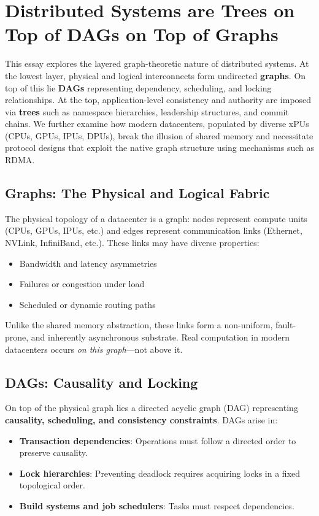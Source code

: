 \documentclass[../../../OAE-SPEC-MAIN.tex]{subfiles}
\begin{document}
\section{Distributed Systems are Trees on Top of DAGs on Top of Graphs}

This essay explores the layered graph-theoretic nature of distributed systems. At the lowest layer, physical and logical interconnects form undirected \textbf{graphs}. On top of this lie \textbf{DAGs} representing dependency, scheduling, and locking relationships. At the top, application-level consistency and authority are imposed via \textbf{trees} such as namespace hierarchies, leadership structures, and commit chains. We further examine how modern datacenters, populated by diverse xPUs (CPUs, GPUs, IPUs, DPUs), break the illusion of shared memory and necessitate protocol designs that exploit the native graph structure using mechanisms such as RDMA.

\subsection{Graphs: The Physical and Logical Fabric}
The physical topology of a datacenter is a graph: nodes represent compute units (CPUs, GPUs, IPUs, etc.) and edges represent communication links (Ethernet, NVLink, InfiniBand, etc.). These links may have diverse properties:
\begin{itemize}[noitemsep]
  \item Bandwidth and latency asymmetries
  \item Failures or congestion under load
  \item Scheduled or dynamic routing paths
\end{itemize}

Unlike the shared memory abstraction, these links form a non-uniform, fault-prone, and inherently asynchronous substrate. Real computation in modern datacenters occurs \textit{on this graph}---not above it.

\subsection{DAGs: Causality and Locking}
On top of the physical graph lies a directed acyclic graph (DAG) representing \textbf{causality, scheduling, and consistency constraints}. DAGs arise in:
\begin{itemize}[noitemsep]
  \item \textbf{Transaction dependencies}: Operations must follow a directed order to preserve causality.
  \item \textbf{Lock hierarchies}: Preventing deadlock requires acquiring locks in a fixed topological order.
  \item \textbf{Build systems and job schedulers}: Tasks must respect dependencies.
\end{itemize}
\end{document}
